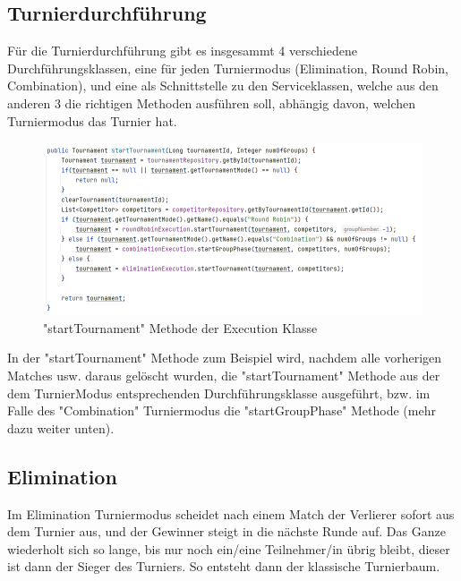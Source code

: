 \subsection{Turnierdurchführung}

Für die Turnierdurchführung gibt es insgesammt 4 verschiedene Durchführungsklassen, eine für jeden Turniermodus (Elimination, Round Robin, Combination), und eine als Schnittstelle zu den Serviceklassen, welche aus den anderen 3 
die richtigen Methoden ausführen soll, abhängig davon, welchen Turniermodus das Turnier hat. 

\begin{figure}[H]
    \includegraphics[scale=0.65]{pics/execution_startTournament.png}
    \caption{"startTournament" Methode der Execution Klasse}
\end{figure}

In der "startTournament" Methode zum Beispiel wird, nachdem alle vorherigen Matches usw. daraus gelöscht wurden, die "startTournament" Methode aus der dem TurnierModus entsprechenden Durchführungsklasse ausgeführt, 
bzw. im Falle des "Combination" Turniermodus die "startGroupPhase" Methode (mehr dazu weiter unten).

\subsection{Elimination}

Im Elimination Turniermodus scheidet nach einem Match der Verlierer sofort aus dem Turnier aus, und der Gewinner steigt in die nächste Runde auf. 
Das Ganze wiederholt sich so lange, bis nur noch ein/eine Teilnehmer/in übrig bleibt, dieser ist dann der Sieger des Turniers. So entsteht dann der klassische Turnierbaum.

